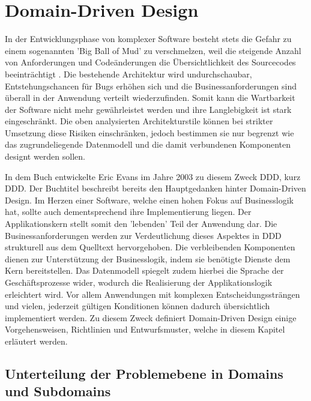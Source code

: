 \section{Domain-Driven Design}

In der Entwicklungsphase von komplexer Software besteht stets die Gefahr zu einem sogenannten 'Big Ball of Mud' zu verschmelzen, weil die steigende Anzahl von Anforderungen und Codeänderungen die Übersichtlichkeit des Sourcecodes beeinträchtigt \cite{bbom.1999}. Die bestehende Architektur wird undurchschaubar, Entstehungschancen für Bugs erhöhen sich und die Businessanforderungen sind überall in der Anwendung verteilt wiederzufinden. Somit kann die Wartbarkeit der Software nicht mehr gewährleistet werden und ihre Langlebigkeit ist stark eingeschränkt. Die oben analysierten Architekturstile können bei strikter Umsetzung diese Risiken einschränken, jedoch bestimmen sie nur begrenzt wie das zugrundeliegende Datenmodell und die damit verbundenen Komponenten designt werden sollen. 

In dem Buch  entwickelte Eric Evans im Jahre 2003 zu diesem Zweck \acrlong{DDD}, kurz \acrshort{DDD}. Der Buchtitel beschreibt bereits den Hauptgedanken hinter Domain-Driven Design. Im Herzen einer Software, welche einen hohen Fokus auf Businesslogik hat, sollte auch dementsprechend ihre Implementierung liegen. Der Applikationskern stellt somit den 'lebenden' Teil der Anwendung dar. Die Businessanforderungen werden zur Verdeutlichung dieses Aspektes in DDD strukturell aus dem Quelltext hervorgehoben. Die verbleibenden Komponenten dienen zur Unterstützung der Businesslogik, indem sie benötigte Dienste dem Kern bereitstellen. Das Datenmodell spiegelt zudem hierbei die Sprache der Geschäftsprozesse wider, wodurch die Realisierung der Applikationslogik erleichtert wird. Vor allem Anwendungen mit komplexen Entscheidungssträngen und vielen, jederzeit gültigen Konditionen können dadurch übersichtlich implementiert werden. Zu diesem Zweck definiert Domain-Driven Design einige Vorgehensweisen, Richtlinien und Entwurfsmuster, welche in diesem Kapitel erläutert werden. \cite{Evans.2011, Vernon.2015}

\subsection{Unterteilung der Problemebene in Domains und Subdomains}

